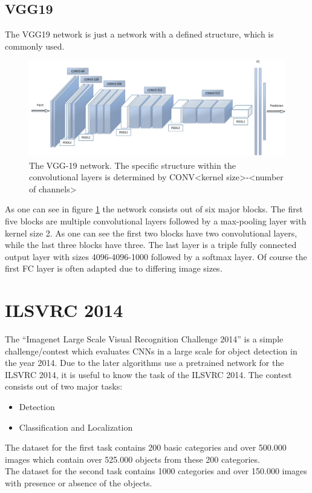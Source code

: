 \documentclass[
     11pt,         %
     a4paper,      %
     oneside,
     ]{article}
\begin{document}
\subsection{VGG19}
The VGG19 network is just a network with a defined structure, which is commonly used.
\begin{figure}[H]
  \begin{center}
    \includegraphics[width=1.0\textwidth]{images/VGG19-orig.png}
    \caption{The VGG-19 network. The specific structure within the convolutional layers is determined by CONV<kernel size>-<number of channels>}
    \label{fig:VGG19-orig}
  \end{center}
\end{figure}
As one can see in figure \ref{fig:VGG19-orig} the network consists out of six major blocks. The first five blocks are multiple convolutional layers followed by a max-pooling layer with kernel size 2. As one can see the first two blocks have two convolutional layers, while the last three blocks have three. The last layer is a triple fully connected output layer with sizes 4096-4096-1000 followed by a softmax layer. Of course the first FC layer is often adapted due to differing image sizes.

\section{ILSVRC 2014}
The \enquote{Imagenet Large Scale Visual Recognition Challenge 2014} is a simple challenge/contest which evaluates CNNs in a large scale for object detection in the year 2014.
Due to the later algorithms use a pretrained network for the ILSVRC 2014, it is useful to know the task of the ILSVRC 2014.
The contest consists out of two major tasks:
\begin{itemize}
  \item Detection
  \item Classification and Localization
\end{itemize}
The dataset for the first task contains 200 basic categories and over 500.000 images which contain over 525.000 objects from these 200 categories.\\
The dataset for the second task contains 1000 categories and over 150.000 images with presence or absence of the objects.\\
\end{document}
